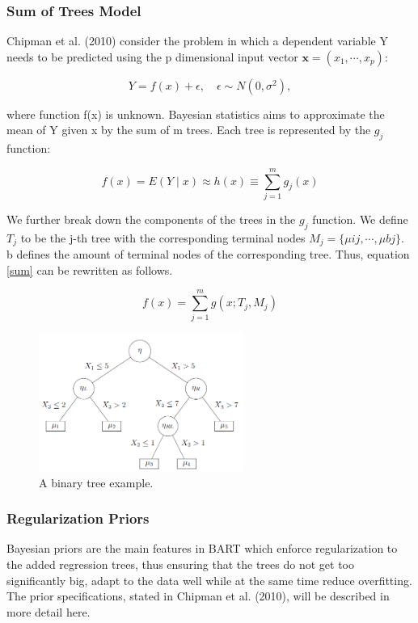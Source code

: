 \documentclass{usiinftr}
\begin{document}
\subsubsection{Sum of Trees Model}
Chipman et al. (2010) consider the problem in which a dependent variable Y needs to be predicted using the p dimensional input vector $\textbf{x} = (x_1,\cdots, x_p)$:

\begin{equation}
Y=f(x)+\epsilon, \quad \epsilon \sim N\left(0, \sigma^{2}\right),
\end{equation}

where function f(x) is unknown. Bayesian statistics aims to approximate the mean of Y given x by the sum of m trees. Each tree is represented by the $g_j$ function:

\begin{equation} \label{sum}
f(x)=E(Y \mid x) \approx h(x) \equiv \sum_{j=1}^{m} g_{j}(x)
\end{equation}

We further break down the components of the trees in the $g_j$ function. We define $T_j$ to be the j-th tree with the corresponding terminal nodes $M_j = \{ \mu{ij}, \cdots, \mu{bj} \}$. b defines the amount of terminal nodes of the corresponding tree. Thus, equation \ref{sum} can be rewritten as follows.

\begin{equation} \label{sum1}
f(x)= \sum_{j=1}^{m} g(x;T_j,M_j)
\end{equation}

\begin{figure}[h!] 
\centering
\includegraphics[width=0.6\textwidth]{images/image113.png}
\caption{A binary tree example.}
\label{bintree}
\end{figure}

\subsubsection{Regularization Priors}\label{prior}
Bayesian priors are the main features in BART which enforce regularization to the added regression trees, thus ensuring that the trees do not get too significantly big, adapt to the data well while at the same time reduce overfitting. The prior specifications, stated in Chipman et al. (2010), will be described in more detail here.
\end{document}
